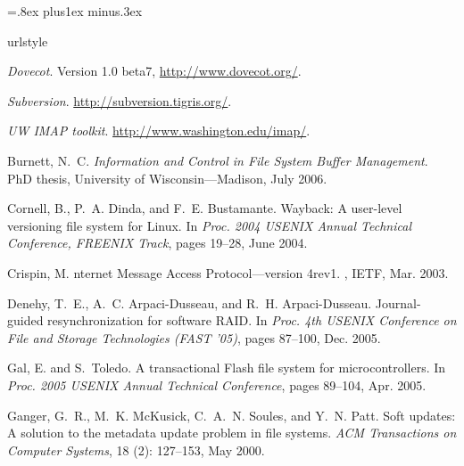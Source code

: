 \documentclass[9pt,twocolumn,letterpaper]{article}
\begin{document}
\begin{footnotesize}
\bibsep=.8ex plus1ex minus.3ex
\begin{thebibliography}{43}
\providecommand{\natexlab}[1]{#1}
\expandafter\ifx\csname urlstyle\endcsname\relax
  \providecommand{\doi}[1]{doi: #1}\else
  \providecommand{\doi}{doi: \begingroup \urlstyle{rm}\Url}\fi

\emph{Dovecot}.
\newblock Version 1.0 beta7, \url{http://www.dovecot.org/}.

\emph{Subversion}.
\newblock \url{http://subversion.tigris.org/}.

\emph{{UW IMAP} toolkit}.
\newblock \url{http://www.washington.edu/imap/}.

Burnett, N.~C.
\newblock \emph{Information and Control in File System Buffer Management}.
\newblock PhD thesis, University of Wisconsin---Madison, July 2006.

Cornell, B., P.~A. Dinda, and F.~E. Bustamante.
\newblock Wayback: A user-level versioning file system for {L}inux.
\newblock In \emph{Proc. 2004 USENIX Annual Technical Conference, FREENIX
  Track}, pages 19--28, June 2004.

Crispin, M.
nternet {M}essage {A}ccess {P}rotocol---version 4rev1.
, IETF, Mar. 2003.

Denehy, T.~E., A.~C. Arpaci-Dusseau, and R.~H. Arpaci-Dusseau.
\newblock Journal-guided resynchronization for software {RAID}.
\newblock In \emph{Proc. 4th {USENIX} Conference on File and Storage
  Technologies ({FAST} '05)}, pages 87--100, Dec. 2005.

Gal, E. and S.~Toledo.
\newblock A transactional {F}lash file system for microcontrollers.
\newblock In \emph{Proc. 2005 {USENIX} Annual Technical Conference}, pages
  89--104, Apr. 2005.

Ganger, G.~R., M.~K. McKusick, C.~A.~N. Soules, and Y.~N. Patt.
\newblock Soft updates: A solution to the metadata update problem in file
  systems.
\newblock \emph{{ACM} Transactions on Computer Systems}, 18
  (2): 127--153, May 2000.


\end{thebibliography}
\end{footnotesize}
\end{document}

